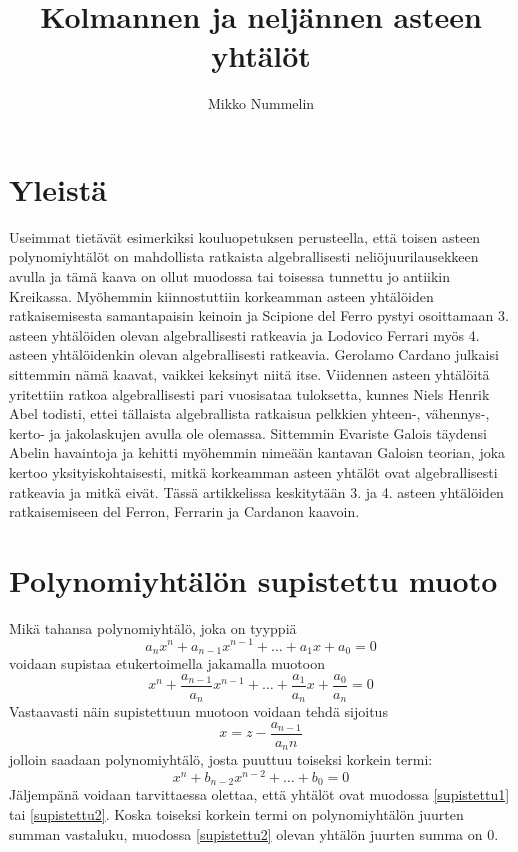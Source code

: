 \documentclass[a4paper]{article}
\begin{document}
\title{Kolmannen ja neljännen asteen yhtälöt}
\author{Mikko Nummelin}
\maketitle
\tableofcontents
\section{Yleistä}
Useimmat tietävät esimerkiksi kouluopetuksen perusteella, että toisen asteen polynomiyhtälöt on mahdollista ratkaista algebrallisesti neliöjuurilausekkeen avulla ja tämä kaava on ollut muodossa tai toisessa tunnettu jo antiikin Kreikassa. Myöhemmin kiinnostuttiin korkeamman asteen yhtälöiden ratkaisemisesta samantapaisin keinoin ja Scipione del Ferro pystyi osoittamaan 3. asteen yhtälöiden olevan algebrallisesti ratkeavia ja Lodovico Ferrari myös 4. asteen yhtälöidenkin olevan algebrallisesti ratkeavia. Gerolamo Cardano julkaisi sittemmin nämä kaavat, vaikkei keksinyt niitä itse. Viidennen asteen yhtälöitä yritettiin ratkoa algebrallisesti pari vuosisataa tuloksetta, kunnes Niels Henrik Abel todisti, ettei tällaista algebrallista ratkaisua pelkkien yhteen-, vähennys-, kerto- ja jakolaskujen avulla ole olemassa. Sittemmin Evariste Galois täydensi Abelin havaintoja ja kehitti myöhemmin nimeään kantavan Galoisn teorian, joka kertoo yksityiskohtaisesti, mitkä korkeamman asteen yhtälöt ovat algebrallisesti ratkeavia ja mitkä eivät. Tässä artikkelissa keskitytään 3. ja 4. asteen yhtälöiden ratkaisemiseen del Ferron, Ferrarin ja Cardanon kaavoin.
\section{Polynomiyhtälön supistettu muoto}
Mikä tahansa polynomiyhtälö, joka on tyyppiä
$$
a_n x^n+a_{n-1} x^{n-1}+\ldots+a_1 x+a_0 = 0
$$
voidaan supistaa etukertoimella jakamalla muotoon
\begin{equation}
  \label{supistettu1}
x^n+\frac{a_{n-1}}{a_n} x^{n-1}+\ldots+\frac{a_1}{a_n} x+\frac{a_0}{a_n} = 0
\end{equation}
Vastaavasti näin supistettuun muotoon voidaan tehdä sijoitus
$$
x=z-\frac{a_{n-1}}{a_n n}
$$
jolloin saadaan polynomiyhtälö, josta puuttuu toiseksi korkein termi:
\begin{equation}
  \label{supistettu2}
x^n+b_{n-2} x^{n-2}+\ldots+b_0 = 0
\end{equation}
Jäljempänä voidaan tarvittaessa olettaa, että yhtälöt ovat muodossa \ref{supistettu1} tai \ref{supistettu2}. Koska toiseksi korkein termi on polynomiyhtälön juurten summan vastaluku, muodossa \ref{supistettu2} olevan yhtälön juurten summa on 0.
\end{document}
